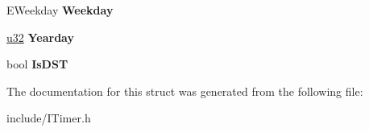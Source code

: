 \begin{DoxyCompactItemize}
\item 
E\+Weekday {\bfseries Weekday}\hypertarget{structirr_1_1ITimer_1_1RealTimeDate_a81320e596906e61abac7db978bd96276}{}\label{structirr_1_1ITimer_1_1RealTimeDate_a81320e596906e61abac7db978bd96276}

\item 
\hyperlink{namespaceirr_a0416a53257075833e7002efd0a18e804}{u32} {\bfseries Yearday}\hypertarget{structirr_1_1ITimer_1_1RealTimeDate_aa5617f09bd0a5a311a3fe1b9d1b07f50}{}\label{structirr_1_1ITimer_1_1RealTimeDate_aa5617f09bd0a5a311a3fe1b9d1b07f50}

\item 
bool {\bfseries Is\+D\+ST}\hypertarget{structirr_1_1ITimer_1_1RealTimeDate_a20c5475e8e9a65e410f218f192ca6d28}{}\label{structirr_1_1ITimer_1_1RealTimeDate_a20c5475e8e9a65e410f218f192ca6d28}

\end{DoxyCompactItemize}


The documentation for this struct was generated from the following file\+:\begin{DoxyCompactItemize}
\item 
include/I\+Timer.\+h\end{DoxyCompactItemize}

